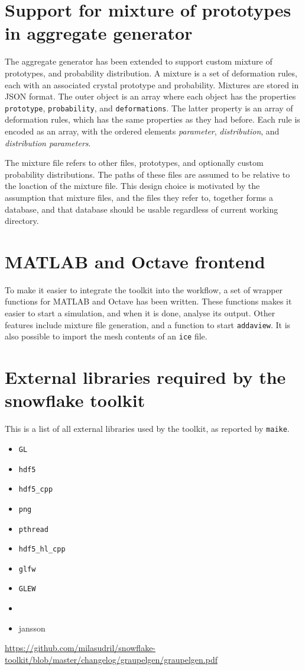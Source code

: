 \documentclass[a4paper,10pt]{scrartcl}
\newcommand{\prgname}[1]{\texttt{#1}}
\begin{document}
\section{Support for mixture of prototypes in aggregate generator}
The aggregate generator has been extended to support custom mixture of prototypes, and probability distribution. A mixture is a set of deformation rules, each with an associated crystal prototype and probability. Mixtures are stored in JSON format. The outer object is an array where each object has the properties \texttt{prototype}, \texttt{probability}, and \texttt{deformations}. The latter property is an array of deformation rules, which has the same properties as they had before. Each rule is encoded as an array, with the ordered elements \textit{parameter}, \textit{distribution}, and \textit{distribution parameters}.

The mixture file refers to other files, prototypes, and optionally custom probability distributions. The paths of these files are assumed to be relative to the loaction of the mixture file. This design choice is motivated by the assumption that mixture files, and the files they refer to, together forms a database, and that database should be usable regardless of current working directory.

\section{MATLAB and Octave frontend}
To make it easier to integrate the toolkit into the workflow, a set of wrapper functions for MATLAB and Octave has been written. These functions makes it easier to start a simulation, and when it is done, analyse its output. Other features include mixture file generation, and a function to start \texttt{addaview}. It is also possible to import the mesh contents of an \texttt{ice} file.

\section{External libraries required by the snowflake toolkit}
This is a list of all external libraries used by the toolkit, as reported by \prgname{maike}.

\begin{itemize}
\item \texttt{GL}
 \item \texttt{hdf5}
 \item \texttt{hdf5\_cpp}
 \item \texttt{png}
 \item \texttt{pthread}
 \item \texttt{hdf5\_hl\_cpp}
 \item \texttt{glfw}
 \item \texttt{GLEW}
 \item \item{jansson}
 \end{itemize}

\begin{thebibliography}{9}
 \url{https://github.com/milasudril/snowflake-toolkit/blob/master/changelog/graupelgen/graupelgen.pdf}
\end{thebibliography}
\vfill
\end{document}
